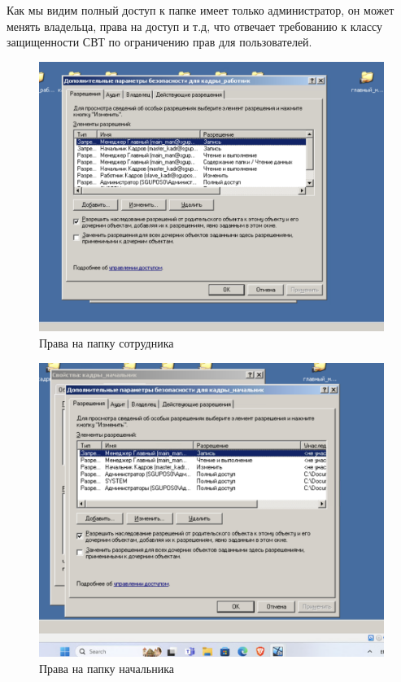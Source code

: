 Как мы видим полный доступ к папке имеет только администратор, он может менять владельца, права на доступ и т.д,
 что отвечает требованию к классу защищенности СВТ по ограничению прав для пользователей.
\begin{figure}[H]
    \centering
    \includegraphics[width=1\textwidth]{pict/prac/9}
    \caption{Права на папку сотрудника}
    \label{fig:21}
\end{figure}

\begin{figure}[H]
  \centering
  \includegraphics[width=1\textwidth]{pict/prac/10}
  \caption{Права на папку начальника}
  \label{fig:22}
\end{figure}

